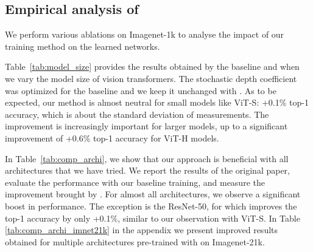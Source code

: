\begin{table}
    \centering
    \vspace{-0.7em}
    \caption{Ablation on the loss for \ours with ViT-H trained at resolution $126\!\times\!126$ on Imagenet-1k during 800 epochs. The training is inherited from DeiT-III, which also uses BCE when training with Imagenet-1k only. }
    \label{tab:loss_abl}
\end{table}


\subsection{Empirical analysis of \ours}

We perform various ablations on Imagenet-1k to analyse the impact of our training method on the learned networks.

Table~\ref{tab:model_size} provides the results obtained by the baseline and \ours when we vary the model size of vision transformers. The stochastic depth coefficient was optimized for the baseline and we keep it unchanged with \ours. As to be expected, our method is almost neutral for small models like ViT-S: +0.1\% top-1 accuracy, which is about the standard deviation of measurements. The improvement is increasingly important for larger models, up to a significant improvement of +0.6\% top-1 accuracy for ViT-H models. 

In Table~\ref{tab:comp_archi}, we show that our approach is beneficial with all architectures that we have tried. We report the results of the original paper, evaluate the performance with our baseline training, and measure the improvement brought by \ours. For almost all architectures, we observe a significant boost in performance. The exception is the ResNet-50, for which \ours improves the top-1 accuracy by only +0.1\%, similar to our observation with ViT-S. 
In Table \ref{tab:comp_archi_imnet21k} in the appendix  we present improved results obtained for multiple architectures pre-trained with \ours on Imagenet-21k. 





